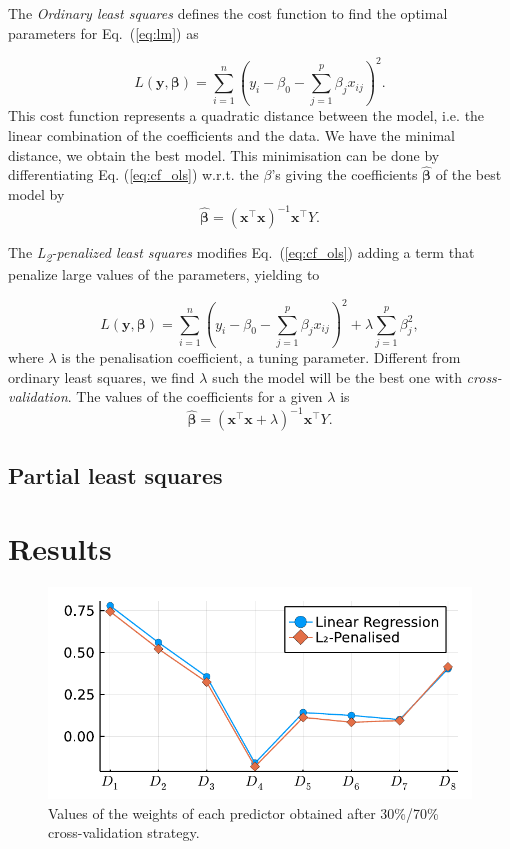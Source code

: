 \documentclass[conference]{IEEEtran}
\begin{document}
The \emph{Ordinary least squares} defines the cost function to find the optimal parameters for Eq.~(\ref{eq:lm}) as

\begin{equation}\label{eq:cf_ols}
  L(\mathbf{y}, \boldsymbol{\beta}) =\sum_{i=1}^{n}\left(y_{i}-\beta_{0}-\sum_{j=1}^{p} \beta_{j} x_{i j}\right)^{2}.
\end{equation}
%
This cost function represents a quadratic distance between the model, i.e. the linear combination of the coefficients and the data. We have the minimal distance, we obtain the best model. This minimisation can be done by differentiating Eq. (\ref{eq:cf_ols}) w.r.t. the $\beta$'s giving the coefficients $\hat{\boldsymbol{\beta}}$ of the best model by
%
\[
\hat{\boldsymbol{\beta}} = (\mathbf{x}^\top\mathbf{x})^{-1}\mathbf{x}^\top Y.
\]

The \emph{L\textsubscript{2}-penalized least squares} modifies Eq.~(\ref{eq:cf_ols}) adding a term that penalize large values of the parameters, yielding to

\begin{equation}
  L(\mathbf{y}, \boldsymbol{\beta}) = \sum_{i=1}^{n}\left(y_{i}-\beta_{0}-\sum_{j=1}^{p} \beta_{j} x_{i j}\right)^{2}+\lambda \sum_{j=1}^{p} \beta_{j}^{2},
\end{equation}
%
where $\lambda$ is the penalisation coefficient, a tuning parameter. Different from ordinary least squares, we find $\lambda$ such the model will be the best one with \emph{cross-validation}. The values of the coefficients for a given $\lambda$ is 
%
\[
\hat{\boldsymbol{\beta}} = (\mathbf{x}^\top\mathbf{x} + \lambda)^{-1}\mathbf{x}^\top Y.
\]

\subsection{Partial least squares}

\section{Results}

\begin{figure}[htbp]
\centerline{\includegraphics[width=\columnwidth]{../figures/fitted_params_70}}
\caption{Values of the weights of each predictor obtained after 30\%/70\% cross-validation strategy.}
\end{figure}
\end{document}
